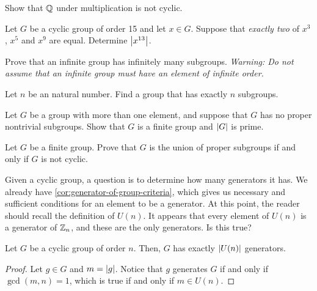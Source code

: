 \documentclass[./main.tex]{subfiles}
\begin{document}
\begin{exercise}
    Show that $\mathbb{Q}$ under multiplication is not cyclic.
\end{exercise}

\begin{exercise}
    Let $G$ be a cyclic group of order 15 and let $x \in G$. Suppose that
    \emph{exactly two} of $x^3$, $x^5$ and $x^9$ are equal. Determine
    $\abs{x^{13}}$.
\end{exercise}

\begin{exercise}
    Prove that an infinite group has infinitely many subgroups.
    \textit{Warning: Do not assume that an infinite group must have an element of infinite order.}
\end{exercise}

\begin{exercise}
    Let $n$ be an natural number. Find a group that has exactly $n$ subgroups.
\end{exercise}

\begin{prob}
    Let $G$ be a group with more than one element, and suppose that $G$ has no
    proper nontrivial subgroups. Show that $G$ is a finite group and $\abs G$ is
    prime.
\end{prob}

\begin{prob}
    Let $G$ be a finite group. Prove that $G$ is the union of proper subgroups if
    and only if $G$ is not cyclic.
\end{prob}

Given a cyclic group, a question is to determine how many generators it has. We
already have \cref{cor:generator-of-group-criteria}, which gives us necessary
and sufficient conditions for an element to be a generator. At this point, the
reader should recall the definition of $U(n)$. It appears that every element of
$U(n)$ is a generator of $\mathbb{Z}_n$, and these are the only generators. Is this
true? 

\begin{proposition}
    Let $G$ be a cyclic group of order $n$. Then, $G$ has exactly $\abs{U(n)}$
    generators.
\end{proposition}
\begin{proof}
    Let $g \in G$ and $m = \abs g$. Notice that $g$ generates $G$ if and only if
    $\gcd(m, n) = 1$, which is true if and only if $m \in U(n)$. 
\end{proof}
\end{document}
